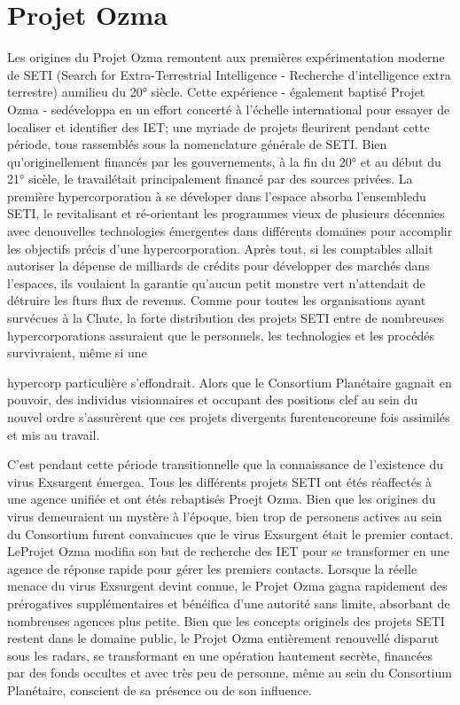 \section{Projet Ozma} 

Les origines du Projet Ozma remontent aux premières expérimentation moderne de SETI (Search for Extra-Terrestrial Intelligence - Recherche d'intelligence extra terrestre) aumilieu du 20° siècle. Cette expérience - également baptisé Projet Ozma - sedéveloppa en un effort concerté à l'échelle international pour essayer de localiser et identifier des IET; une myriade de projets fleurirent pendant cette période, tous rassemblés sous la nomenclature générale de SETI. Bien qu'originellement financés par les gouvernements, à la fin du 20° et au début du 21° sicèle, le travailétait principalement financé par des sources privées. La première hypercorporation à se déveloper dans l'espace absorba l'ensembledu SETI, le revitalisant et ré-orientant les programmes vieux de plusieurs décennies avec denouvelles technologies émergentes dans différents domaines pour accomplir les objectifs précis d'une hypercorporation. Après tout, si les comptables allait autoriser la dépense de milliards de crédits pour développer des marchés dans l'espaces, ils voulaient la garantie qu'aucun petit monstre vert n'attendait de détruire les fturs flux de revenus. Comme pour toutes les organisations ayant survécues à la Chute, la forte distribution des projets SETI entre de nombreuses hypercorporations assuraient que le personnels, les technologies et les procédés survivraient, même si une 

hypercorp particulière s'effondrait.  Alors que le Consortium Planétaire gagnait en pouvoir, des individus visionnaires et occupant des positions clef au sein du nouvel ordre s'assurèrent que ces projets divergents furentencoreune fois assimilés et mis au travail. 

C'est pendant cette période transitionnelle que la connaissance de l'existence du virus Exsurgent émergea. Tous les différents projets SETI ont étés réaffectés à une agence unifiée et ont étés rebaptisés Proejt Ozma. Bien que les origines du virus demeuraient un mystère à l'époque, bien trop de personens actives au sein du Consortium furent convaincues que le virus Exsurgent était le premier contact. LeProjet Ozma modifia son but de recherche des IET pour se transformer en une agence de réponse rapide pour gérer les premiers contacts. Lorsque la réelle menace du virus Exsurgent devint connue, le Projet Ozma gagna rapidement des prérogatives supplémentaires et bénéifica d'une autorité sans limite, absorbant de nombreuses agences plus petite. Bien que les concepts originels des projets SETI restent dans le domaine public, le Projet Ozma entièrement renouvellé disparut sous les radars, se transformant en une opération hautement secrète, financées par des fonds occultes et avec très peu de personne, même au sein du Consortium Planétaire, conscient de sa présence ou de son influence. 

